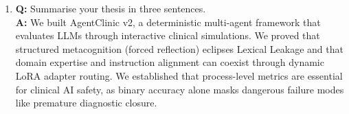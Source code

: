 \begin{vivabox}[\textcolor{white}{Likely Viva Questions}]
\begin{enumerate}
    \item \textbf{Q:} Summarise your thesis in three sentences.\\
    \textbf{A:} We built AgentClinic v2, a deterministic multi-agent framework that evaluates LLMs through interactive clinical simulations. We proved that structured metacognition (forced reflection) eclipses Lexical Leakage and that domain expertise and instruction alignment can coexist through dynamic LoRA adapter routing. We established that process-level metrics are essential for clinical AI safety, as binary accuracy alone masks dangerous failure modes like premature diagnostic closure.
\end{enumerate}
\end{vivabox}

